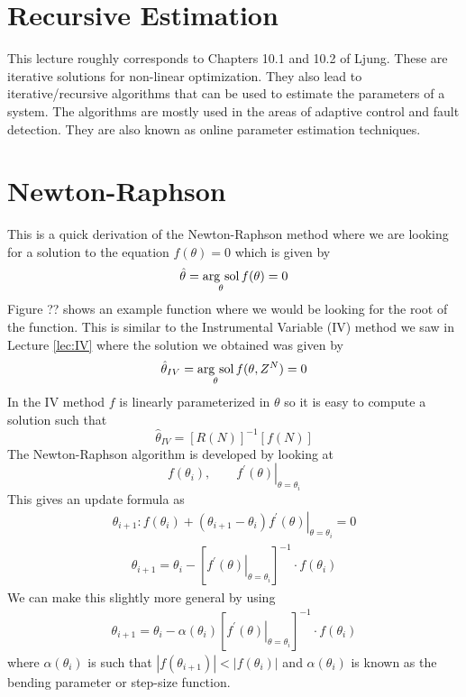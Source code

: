 
\mainmatter
\setcounter{page}{1}

\lectureseries[\course]{\course}

\date{December 1, 2009}

\setaddress

\setcounter{lecture}{17}
\setcounter{chapter}{17}


\section{Recursive Estimation}
This lecture roughly corresponds to Chapters 10.1 and 10.2 of Ljung. These are iterative solutions for non-linear optimization. They also lead to iterative/recursive algorithms that can be used to estimate the parameters of a system. The algorithms are mostly used in the areas of adaptive control and fault detection. They are also known as online parameter estimation techniques.

\section{Newton-Raphson}
This is a quick derivation of the Newton-Raphson method where we are looking for a solution to the equation $f(\theta)=0$ which is given by
$$\hat{\theta} = \mathop{\arg\,\text{sol}}\limits_\theta f(\theta) = 0$$
Figure ?? shows an example function where we would be looking for the root of the function. This is similar to the Instrumental Variable (IV) method we saw in Lecture \ref{lec:IV} where the solution we obtained was given by
$$\hat{\theta}_{IV} = \mathop{\arg\,\text{sol}}\limits_\theta f(\theta,Z^N) = 0$$
In the IV method $f$ is linearly parameterized in $\theta$ so it is easy to compute a solution such that
$$\hat{\theta}_{IV} = [R(N)]^{-1}[f(N)]$$
The Newton-Raphson algorithm is developed by looking at
$$f(\theta_i), \qquad \left.f^\prime(\theta)\right|_{\theta=\theta_i}$$
This gives an update formula as
\begin{align*}
\theta_{i+1}: f(\theta_i) + (\theta_{i+1}-\theta_i)\left.f^\prime(\theta)\right|_{\theta=\theta_i} = 0
\end{align*}
\begin{align*}
\boxed{\theta_{i+1} = \theta_i - \left[\left.f^\prime(\theta)\right|_{\theta=\theta_i}\right]^{-1}\cdot f(\theta_i)}
\end{align*}
We can make this slightly more general by using
\begin{align*}
\boxed{\theta_{i+1} = \theta_i - \alpha(\theta_i)\left[\left.f^\prime(\theta)\right|_{\theta=\theta_i}\right]^{-1}\cdot f(\theta_i)}
\end{align*}
where $\alpha(\theta_i)$ is such that $|f(\theta_{i+1})|<|f(\theta_i)|$ and $\alpha(\theta_i)$ is known as the bending parameter or step-size function.

